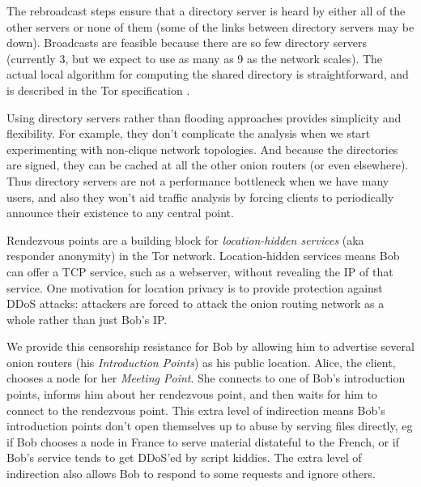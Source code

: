 \documentclass[times,10pt,twocolumn]{article}
\begin{document}
The rebroadcast steps ensure that a directory server is heard by either
all of the other servers or none of them (some of the links between
directory servers may be down). Broadcasts are feasible because there
are so few directory servers (currently 3, but we expect to use as many
as 9 as the network scales). The actual local algorithm for computing
the shared directory is straightforward, and is described in the Tor
specification \cite{tor-spec}.

Using directory servers rather than flooding approaches provides
simplicity and flexibility. For example, they don't complicate
the analysis when we start experimenting with non-clique network
topologies. And because the directories are signed, they can be cached at
all the other onion routers (or even elsewhere). Thus directory servers
are not a performance bottleneck when we have many users, and also they
won't aid traffic analysis by forcing clients to periodically announce
their existence to any central point.


\label{sec:rendezvous}

Rendezvous points are a building block for \emph{location-hidden services}
(aka responder anonymity) in the Tor network. Location-hidden services
means Bob can offer a TCP service, such as a webserver, without revealing
the IP of that service. One motivation for location privacy is to provide
protection against DDoS attacks: attackers are forced to attack the
onion routing network as a whole rather than just Bob's IP.

We provide this censorship resistance for Bob by allowing him to
advertise several onion routers (his \emph{Introduction Points}) as his
public location. Alice, the client, chooses a node for her \emph{Meeting
Point}. She connects to one of Bob's introduction points, informs him
about her rendezvous point, and then waits for him to connect to the
rendezvous
point. This extra level of indirection means Bob's introduction points
don't open themselves up to abuse by serving files directly, eg if Bob
chooses a node in France to serve material distateful to the French,
%
%
or if Bob's service tends to get DDoS'ed by script kiddies.
The extra level of indirection also allows Bob to respond to some requests
and ignore others.
\end{document}
